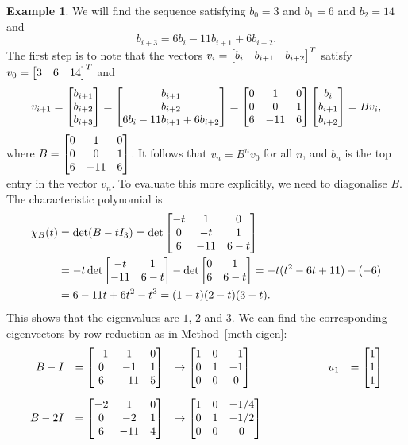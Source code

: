 \documentclass[reqno]{amsart}
\theoremstyle{definition}
\newtheorem{example}[theorem]{Example}
\begin{document}
\begin{example}\label{eg-difference-ii}
 We will find the sequence satisfying $b_0=3$ and $b_1=6$ and
 $b_2=14$ and
 \[ b_{i+3} = 6b_i-11b_{i+1}+6b_{i+2}. \]
 The first step is to note that the vectors
 $v_i=\left[\begin{matrix} b_i&b_{i+1}&b_{i+2}\end{matrix}\right]^T$ satisfy $v_0=\left[\begin{matrix} 3&6&14\end{matrix}\right]^T$ and
 \[ v_{i+1} =
     \left[\begin{matrix} b_{i+1}\\b_{i+2}\\ b_{i+3}\end{matrix}\right] =
     \left[\begin{matrix} b_{i+1}\\b_{i+2}\\ 6b_i-11b_{i+1}+6b_{i+2}\end{matrix}\right] =
     \left[\begin{matrix} 0&1&0 \\ 0&0&1 \\ 6&-11&6\end{matrix}\right]
      \left[\begin{matrix} b_i \\ b_{i+1}\\ b_{i+2}\end{matrix}\right] =
     B v_i,
 \]
 where $B=\left[\begin{matrix} 0&1&0 \\ 0&0&1 \\ 6&-11&6\end{matrix}\right]$.  It follows that
 $v_n=B^nv_0$ for all $n$, and $b_n$ is the top entry in the vector
 $v_n$.  To evaluate this more explicitly, we need to diagonalise
 $B$.  The characteristic polynomial is
 \begin{align*}
  \chi_B(t)
   &= \det(B-tI_3)
    = \det\left[\begin{matrix} -t&1&0 \\ 0&-t&1 \\ 6&-11&6-t \end{matrix}\right] \\
   &= -t\det\left[\begin{matrix} -t&1\\-11&6-t\end{matrix}\right] - \det\left[\begin{matrix} 0&1\\6&6-t\end{matrix}\right]
    = -t(t^2-6t+11) - (-6) \\
   &= 6-11t+6t^2-t^3 = (1-t)(2-t)(3-t).
 \end{align*}
 This shows that the eigenvalues are $1$, $2$ and $3$.  We can find
 the corresponding eigenvectors by row-reduction as in
 Method~\ref{meth-eigen}:
 \[ \begin{array}{rllcrl}
  B-I  &= \left[\begin{matrix} -1&1&0\\0&-1&1\\6&-11&5 \end{matrix}\right]
       &\to \left[\begin{matrix} 1&0&-1\\0&1&-1\\0&0&0\end{matrix}\right]
       &\hspace{4em}& u_1 &=\left[\begin{matrix} 1\\1\\1\end{matrix}\right] \\[5ex]
  B-2I &= \left[\begin{matrix} -2&1&0\\0&-2&1\\6&-11&4 \end{matrix}\right]
       &\to \left[\begin{matrix} 1&0&-1/4\\0&1&-1/2\\0&0&0\end{matrix}\right]

\end{array}\]
\end{example}
\end{document}

